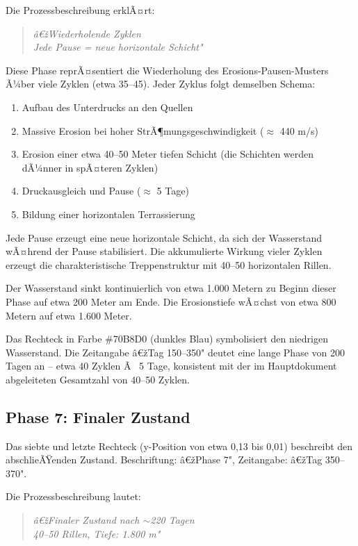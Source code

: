 ﻿\documentclass[12pt,a4paper]{report}
\begin{document}
Die Prozessbeschreibung erklÃ¤rt:
\begin{quote}
	\textit{â€žWiederholende Zyklen\\
		Jede Pause = neue horizontale Schicht"}
\end{quote}

Diese Phase reprÃ¤sentiert die Wiederholung des Erosions-Pausen-Musters Ã¼ber viele Zyklen (etwa 35--45). Jeder Zyklus folgt demselben Schema:
\begin{enumerate}
	\item Aufbau des Unterdrucks an den Quellen
	\item Massive Erosion bei hoher StrÃ¶mungsgeschwindigkeit ($\approx$ 440 m/s)
	\item Erosion einer etwa 40--50 Meter tiefen Schicht (die Schichten werden dÃ¼nner in spÃ¤teren Zyklen)
	\item Druckausgleich und Pause ($\approx$ 5 Tage)
	\item Bildung einer horizontalen Terrassierung
\end{enumerate}

Jede Pause erzeugt eine neue horizontale Schicht, da sich der Wasserstand wÃ¤hrend der Pause stabilisiert. Die akkumulierte Wirkung vieler Zyklen erzeugt die charakteristische Treppenstruktur mit 40--50 horizontalen Rillen.

Der Wasserstand sinkt kontinuierlich von etwa 1.000 Metern zu Beginn dieser Phase auf etwa 200 Meter am Ende. Die Erosionstiefe wÃ¤chst von etwa 800 Metern auf etwa 1.600 Meter.

Das Rechteck in Farbe \#70B8D0 (dunkles Blau) symbolisiert den niedrigen Wasserstand. Die Zeitangabe â€žTag 150--350" deutet eine lange Phase von 200 Tagen an -- etwa 40 Zyklen Ã  5 Tage, konsistent mit der im Hauptdokument abgeleiteten Gesamtzahl von 40--50 Zyklen.

\subsection{Phase 7: Finaler Zustand}

Das siebte und letzte Rechteck (y-Position von etwa 0,13 bis 0,01) beschreibt den abschlieÃŸenden Zustand. Beschriftung: â€žPhase 7", Zeitangabe: â€žTag 350--370".

Die Prozessbeschreibung lautet:
\begin{quote}
	\textit{â€žFinaler Zustand nach $\sim$220 Tagen\\
		40--50 Rillen, Tiefe: 1.800 m"}
\end{quote}
		
\end{document}
